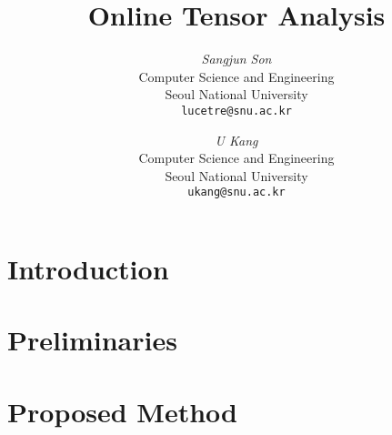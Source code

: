 \documentclass[10pt]{article}
\begin{document}
\newcommand{\method}{\textsc{OnlineTensorAnalysis}\xspace}
\newcommand{\cpals}{CP--ALS\xspace}
\newcommand{\tocp}{TransformedOnlineCP\xspace}
\newcommand{\dtd}{DTD\xspace}
\newcommand{\ocp}{OnlineCP\xspace}
\newcommand{\hosvd}{HOSVD\xspace}

\newcommand\norm[1]{\left\lVert#1\right\rVert}
\newcommand{\beq}{\begin{equation}}
\newcommand{\eeq}{\end{equation}}
\newcommand{\bit}{\begin{itemize*}}
\newcommand{\eit}{\end{itemize*}}
\newcommand{\goal}[1]{ {\noindent {$\Rightarrow$} \em {#1} } }
\newcommand{\hide}[1]{}
\newcommand{\comment}[1]{ {\footnotesize {#1} } }
\newtheorem{lemma}{Lemma}
\newtheorem{theorem}{Theorem}
\newtheorem{proof}{Proof}
\newtheorem{defn}{Definition}
\newtheorem{algo}{Algorithm}
\newtheorem{observation}{Observation}

\title{Online Tensor Analysis}

\author{ {\em Sangjun Son} \\
	    Computer Science and Engineering \\
	    Seoul National University\\
	    {\tt lucetre@snu.ac.kr}
	 \and
	 {\em U Kang} \\
	    Computer Science and Engineering \\
	    Seoul National University\\
	     {\tt ukang@snu.ac.kr}
        }


\maketitle
\begin{abstract}
    
\end{abstract}

\section{Introduction}
    \label{sec:intro}
    

\section{Preliminaries}
    \label{sec:prelim}
    
    
\newpage
\section{Proposed Method}
    \label{sec:proposed}
  	
\end{document}
